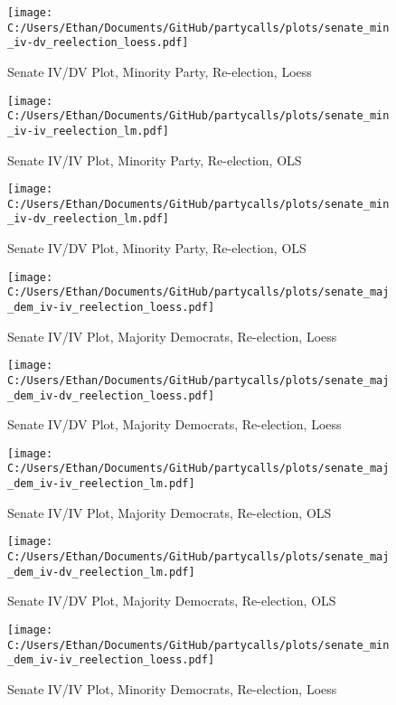 \documentclass[12pt]{article}
\begin{document}
\begin{figure}[H]
	\centering
	\caption{Senate IV/DV Plot, Minority Party, Re-election, Loess}
	\texttt{[image: C:/Users/Ethan/Documents/GitHub/partycalls/plots/senate\_min\_iv-dv\_reelection\_loess.pdf]}
\end{figure}

\begin{figure}[H]
	\centering
	\caption{Senate IV/IV Plot, Minority Party, Re-election, OLS}
	\texttt{[image: C:/Users/Ethan/Documents/GitHub/partycalls/plots/senate\_min\_iv-iv\_reelection\_lm.pdf]}
\end{figure}

\begin{figure}[H]
	\centering
	\caption{Senate IV/DV Plot, Minority Party, Re-election, OLS}
	\texttt{[image: C:/Users/Ethan/Documents/GitHub/partycalls/plots/senate\_min\_iv-dv\_reelection\_lm.pdf]}
\end{figure}

\begin{figure}[H]
	\centering
	\caption{Senate IV/IV Plot, Majority Democrats, Re-election, Loess}
	\texttt{[image: C:/Users/Ethan/Documents/GitHub/partycalls/plots/senate\_maj\_dem\_iv-iv\_reelection\_loess.pdf]}
\end{figure}

\begin{figure}[H]
	\centering
	\caption{Senate IV/DV Plot, Majority Democrats, Re-election, Loess}
	\texttt{[image: C:/Users/Ethan/Documents/GitHub/partycalls/plots/senate\_maj\_dem\_iv-dv\_reelection\_loess.pdf]}
\end{figure}

\begin{figure}[H]
	\centering
	\caption{Senate IV/IV Plot, Majority Democrats, Re-election, OLS}
	\texttt{[image: C:/Users/Ethan/Documents/GitHub/partycalls/plots/senate\_maj\_dem\_iv-iv\_reelection\_lm.pdf]}
\end{figure}

\begin{figure}[H]
	\centering
	\caption{Senate IV/DV Plot, Majority Democrats, Re-election, OLS}
	\texttt{[image: C:/Users/Ethan/Documents/GitHub/partycalls/plots/senate\_maj\_dem\_iv-dv\_reelection\_lm.pdf]}
\end{figure}

\begin{figure}[H]
	\centering
	\caption{Senate IV/IV Plot, Minority Democrats, Re-election, Loess}
	\texttt{[image: C:/Users/Ethan/Documents/GitHub/partycalls/plots/senate\_min\_dem\_iv-iv\_reelection\_loess.pdf]}
\end{figure}
\end{document}

